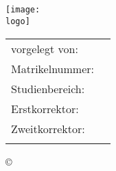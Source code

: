 \thispagestyle{plain}
\begin{titlepage}

	\begin{center}

		\huge{\textbf{\titel}}\\ \vspace{1.5ex}
		\LARGE{\textbf{\art}}\\\vspace{1.5ex}

		\texttt{[image: \\logo]} \vspace{4ex}

		\normalsize
		\begin{tabular}{w{5.4cm}p{6cm}} \\ \vspace{1.2ex}
			vorgelegt von:  & \quad \autor          \\ \vspace{1.2ex}
			Matrikelnummer: & \quad \matrikelnr     \\ \vspace{1.2ex}
			Studienbereich: & \quad \studienbereich \\ \vspace{1.2ex}
			Erstkorrektor:  & \quad \erstkorrektor  \\ \vspace{1.2ex}
			Zweitkorrektor: & \quad \zweitkorrektor \\ \vspace{1.2ex}
		\end{tabular}

		\copyright\ \jahr \vspace{5ex}

	\end{center}


\end{titlepage}
